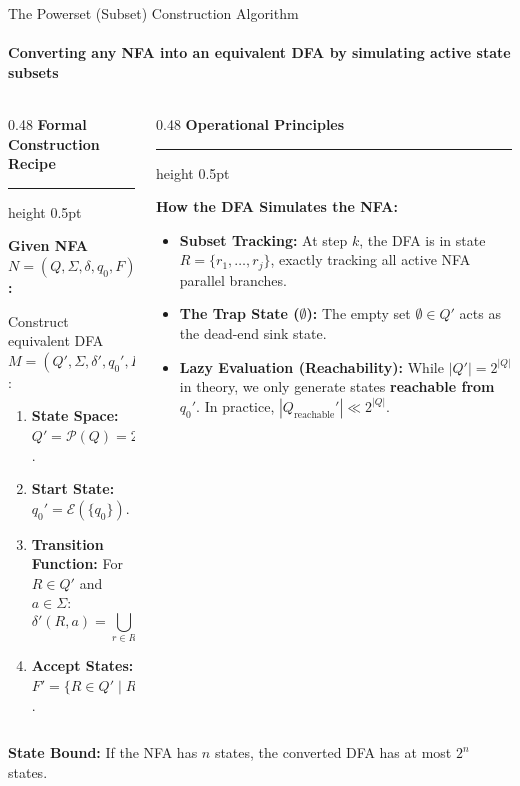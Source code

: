\documentclass[aspectratio=169, 10pt]{beamer}
\newcommand{\colheader}[1]{%
  {\noindent\footnotesize\bfseries\color{gimpanavy}#1}%
  \vspace{0.02cm}%
  {\color{gimpanavy!30}\hrule height 0.5pt}%
  \vspace{0.05cm}%
}
\newcommand{\cardtitle}[1]{{\noindent\footnotesize\bfseries\color{gimpanavy}#1}\par\vspace{0.03cm}}
\newcommand{\greentitle}[1]{{\noindent\footnotesize\bfseries\color{accentGreen}#1}\par\vspace{0.03cm}}
\begin{document}
\begin{frame}{The Powerset (Subset) Construction Algorithm}
  \framesubtitle{Converting any NFA into an equivalent DFA by simulating active state subsets}
  
  \begin{columns}[T]
    \begin{column}{0.48\textwidth}
      \colheader{Formal Construction Recipe}
      \begin{tcolorbox}[conceptcard]
        \cardtitle{Given NFA $N = (Q, \Sigma, \delta, q_0, F)$:}
        {\scriptsize
        Construct equivalent DFA $M = (Q', \Sigma, \delta', q_0', F')$:
        \begin{enumerate}\setlength{\itemsep}{1.5pt}\scriptsize
          \item \textbf{State Space:} $Q' = \mathcal{P}(Q) = 2^Q$.
          \item \textbf{Start State:} $q_0' = \mathcal{E}(\{q_0\})$.
          \item \textbf{Transition Function:} For $R \in Q'$ and $a \in \Sigma$:
          \[ \delta'(R, a) = \textstyle\bigcup_{r \in R} \mathcal{E}\bigl(\delta(r, a)\bigr) \]
          \item \textbf{Accept States:} $F' = \{R \in Q' \mid R \cap F \ne \emptyset\}$.
        \end{enumerate}
        }
      \end{tcolorbox}
    \end{column}
    
    \begin{column}{0.48\textwidth}
      \colheader{Operational Principles}
      \begin{tcolorbox}[examplecard]
        \greentitle{How the DFA Simulates the NFA:}
        \begin{itemize}\setlength{\itemsep}{2pt}\scriptsize
          \item \textbf{Subset Tracking:} At step $k$, the DFA is in state $R = \{r_1, \dots, r_j\}$, exactly tracking all active NFA parallel branches.
          \item \textbf{The Trap State ($\emptyset$):} The empty set $\emptyset \in Q'$ acts as the dead-end sink state.
          \item \textbf{Lazy Evaluation (Reachability):}
          While $|Q'| = 2^{|Q|}$ in theory, we only generate states \textbf{reachable from $q_0'$}. In practice, $|Q_{\text{reachable}}'| \ll 2^{|Q|}$.
        \end{itemize}
      \end{tcolorbox}
    \end{column}
  \end{columns}
  
  \vspace{0.02cm}
  \begin{tcolorbox}[spotlightcard]
    {\scriptsize\textbf{State Bound:} If the NFA has $n$ states, the converted DFA has at most $2^n$ states.}
  \end{tcolorbox}
\end{frame}
\end{document}
